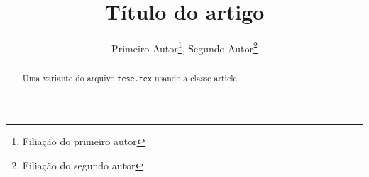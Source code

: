 

\title{Título do artigo}
\author{Primeiro Autor\thanks{Filiação do primeiro autor}, Segundo Autor\thanks{Filiação do segundo autor}}



\date{}



\maketitle

\begin{abstract}
  Uma variante do arquivo \texttt{tese.tex} usando a classe
  \textsf{article}.
\end{abstract}

